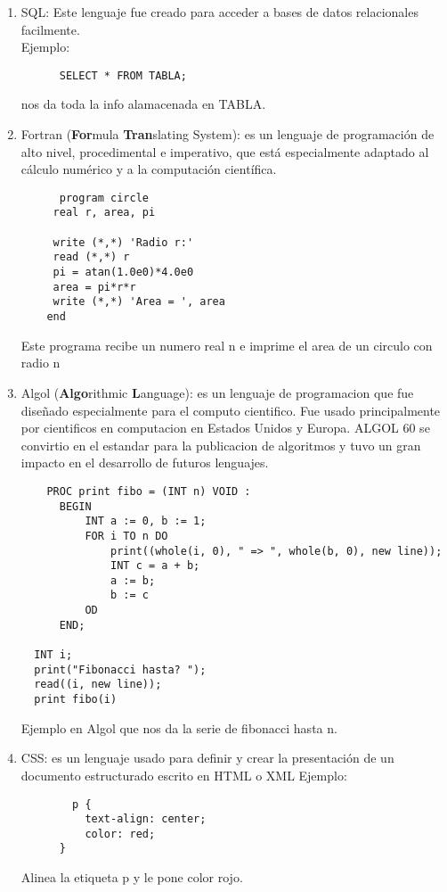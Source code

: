 \documentclass{article}
\begin{document}
\begin{enumerate}
  \item SQL: Este lenguaje fue creado para acceder a bases de datos relacionales facilmente.\\
      Ejemplo:\\  
    \begin{verbatim}
      SELECT * FROM TABLA; 
      \end{verbatim}
      nos da toda la info alamacenada en TABLA.
  \item Fortran (\textbf{For}mula \textbf{Tran}slating System): es un lenguaje de programación de alto nivel, procedimental e imperativo, que está especialmente adaptado al cálculo numérico y a la computación científica. 
    \begin{verbatim}
      program circle
     real r, area, pi

     write (*,*) 'Radio r:'
     read (*,*) r
     pi = atan(1.0e0)*4.0e0
     area = pi*r*r
     write (*,*) 'Area = ', area
    end 
  \end{verbatim}
  Este programa recibe un numero real n e imprime el area de un circulo con radio n
  \item Algol (\textbf{Algo}rithmic \textbf{L}anguage): es un lenguaje de programacion que fue diseñado especialmente para el computo cientifico. Fue usado principalmente por cientificos en computacion en Estados Unidos y Europa. ALGOL 60 se convirtio en el estandar para la publicacion de algoritmos y tuvo un gran impacto en el desarrollo de futuros lenguajes.


  \begin{verbatim}
    PROC print fibo = (INT n) VOID :
      BEGIN
          INT a := 0, b := 1;
          FOR i TO n DO
              print((whole(i, 0), " => ", whole(b, 0), new line));
              INT c = a + b;
              a := b;
              b := c
          OD
      END;

  INT i;
  print("Fibonacci hasta? ");
  read((i, new line));
  print fibo(i)
  \end{verbatim}
Ejemplo en Algol que nos da la serie de fibonacci hasta n.

  \item CSS: es un lenguaje usado para definir y crear la presentación de un documento estructurado escrito en HTML o XML
  Ejemplo:
    \begin{verbatim}
        p {
          text-align: center;
          color: red;
      } 
    \end{verbatim}
    Alinea la etiqueta p y le pone color rojo.
\end{enumerate}
\end{document}
